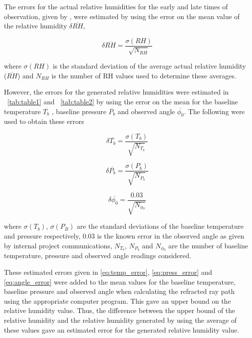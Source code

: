 \documentclass{article}
\newcommand{\tabref}[2][\tablename~]{#1\ref{#2}}
\begin{document}
\vspace{15mm}
\noindent
The errors for the actual relative humidities for the early and late times of observation, given by \cite{Web01}, were estimated by using the error on the mean value of the relative humidity $\delta{\overline{RH}}$,


\begin{equation}
\label{eq:RH_error}
\delta{\overline{RH}} = \frac{\sigma{(RH)}}{\sqrt{N_{RH}}}
\end{equation}

\vspace{2mm}
\noindent
where $\sigma{(RH)}$ is the standard deviation of the average actual relative humidity ($\overline{RH}$) and $N_{RH}$ is the number of RH values used to determine these averages.

\vspace{2mm}
\noindent
However, the errors for the generated relative humidities were estimated in \tabref{tab:table1} and \tabref{tab:table2} by using the error on the mean for the baseline temperature $\overline{T_b}$ \cite{Web01}, baseline pressure $\overline{P_b}$ \cite{Web01} and observed angle $\overline{\phi_0}$. The following were used to obtain these errors

\begin{equation}
\label{eq:temp_error}
\delta{\overline{T_b}} = \frac{\sigma{(T_b)}}{\sqrt{N_{T{_b}}}}
\end{equation}


\begin{equation}
\label{eq:press_error}
\delta{\overline{P_b}} = \frac{\sigma{(P_b)}}{\sqrt{N_{P{_b}}}}
\end{equation}

\begin{equation}
\label{eq:angle_error}
\delta{\overline{\phi_0}} = \frac{0.03}{\sqrt{N_{\phi{_0}}}}
\end{equation}

\vspace{2mm}
\noindent
where $\sigma{(T_b)}$, $\sigma{(P_B)}$ are the standard deviations of the baseline temperature and pressure respectively, 0.03 is the known error in the observed angle as given by internal project communications, $N_{T{_b}}$, $N_{P{_b}}$ and $N_{\phi{_0}}$ are the number of baseline temperature, pressure and observed angle readings considered. 

\vspace{2mm}
\noindent
These estimated errors given in \eqref{eq:temp_error}, \eqref{eq:press_error} and \eqref{eq:angle_error} were added to the mean values for the baseline temperature, baseline pressure and observed angle when calculating the refracted ray path using the appropriate computer program. This gave an upper bound on the relative humidity value. Thus, the difference between the upper bound of the relative humidity and the relative humidity generated by using the average of these values gave an estimated error for the generated relative humidity value.
\end{document}
